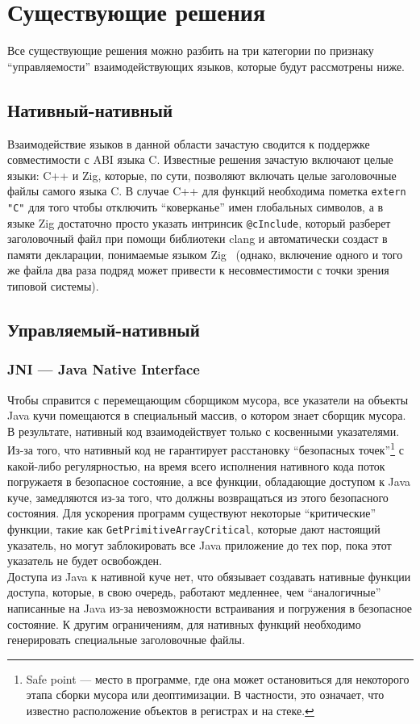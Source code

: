 \documentclass[times,specification,annotation]{itmo-student-thesis}
\begin{document}
\startrelatedwork

\section{Существующие решения}
Все существующие решения можно разбить на три категории по признаку ``управляемости'' взаимодействующих языков, которые будут рассмотрены ниже.

\subsection{Нативный-нативный}
Взаимодействие языков в данной области зачастую сводится к поддержке совместимости с ABI языка C. Известные решения зачастую включают целые языки: C++ и Zig, которые, по сути, позволяют включать целые заголовочные файлы самого языка C. В случае C++ для функций необходима пометка \texttt{extern "C"} для того чтобы отключить ``коверканье'' имен глобальных символов, а в языке Zig достаточно просто указать интринсик \texttt{@cInclude}, который разберет заголовочный файл при помощи библиотеки clang и автоматически создаст в памяти декларации, понимаемые языком Zig~\cite{zig-cinclude} (однако, включение одного и того же файла два раза подряд может привести к несовместимости с точки зрения типовой системы).

\subsection{Управляемый-нативный}
\subsubsection{JNI --- Java Native Interface}
Чтобы справится с перемещающим сборщиком мусора, все указатели на объекты Java кучи помещаются в специальный массив, о котором знает сборщик мусора. В результате, нативный код взаимодействует только с косвенными указателями. Из-за того, что нативный код не гарантирует расстановку ``безопасных точек''\footnote{Safe point --- место в программе, где она может остановиться для некоторого этапа сборки мусора или деоптимизации. В частности, это означает, что известно расположение объектов в регистрах и на стеке.} с какой-либо регулярностью, на время всего исполнения нативного кода поток погружаетя в безопасное состояние, а все функции, обладающие доступом к Java куче, замедляются из-за того, что должны возвращаться из этого безопасного состояния. Для ускорения программ существуют некоторые ``критические'' функции, такие как \texttt{GetPrimitiveArrayCritical}, которые дают настоящий указатель, но могут заблокировать все Java приложение до тех пор, пока этот указатель не будет освобожден.\\
Доступа из Java к нативной куче нет, что обязывает создавать нативные функции доступа, которые, в свою очередь, работают медленнее, чем ``аналогичные'' написанные на Java из-за невозможности встраивания и погружения в безопасное состояние. К другим ограничениям, для нативных функций необходимо генерировать специальные заголовочные файлы.\\
\end{document}
